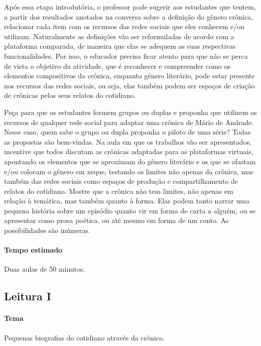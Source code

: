 \documentclass[12pt]{extarticle}
\begin{document}
Após essa etapa introdutória, o professor pode sugerir aos estudantes
que tentem, a partir dos resultados anotados na conversa sobre a
definição do gênero crônica, relacionar cada item com os recursos das
redes sociais que eles conhecem e/ou utilizam. Naturalmente as
definições vão ser reformuladas de acordo com a plataforma comparada, de
maneira que elas se adequem as suas respectivas funcionalidades. Por
isso, o educador precisa ficar atento para que não se perca de vista o
objetivo da atividade, que é reconhecer e compreender como os elementos
compositivos da crônica, enquanto gênero literário, pode estar presente
nos recursos das redes sociais, ou seja, elas também podem ser espaços
de criação de crônicas pelos seus relatos do cotidiano.

Peça para que os estudantes formem grupos ou duplas e proponha que
utilizem os recursos de qualquer rede social para adaptar uma crônica de
Mário de Andrade. Nesse caso, quem sabe o grupo ou dupla proponha o
piloto de uma série? Todas as propostas são bem-vindas. Na aula em que
os trabalhos vão ser apresentados, incentive que todos discutam as
crônicas adaptadas para as plataformas virtuais, apontando os elementos
que se aproximam do gênero literário e os que se afastam e/ou colocam 
o gênero em xeque, testando os limites não apenas da crônica, mas também das
redes sociais como espaços de produção e compartilhamento de relatos do
cotidiano. Mostre que a crônica não tem limites, não apenas em relação à
temática, mas também quanto à forma. Elas podem tanto narrar uma pequena
história sobre um episódio quanto vir em forma de carta a alguém, ou se
apresentar como prosa poética, ou até mesmo em forma de um conto. As
possibilidades são inúmeras.

\paragraph{Tempo estimado} Duas aulas de 50 minutos.

\subsection{Leitura I}


\paragraph{Tema} Pequenas biografias do cotidiano através da crônica.
 
\end{document}
